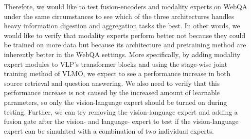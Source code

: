 \documentclass[nohyperref]{article}
\theoremstyle{plain}
\theoremstyle{definition}
\theoremstyle{remark}
\begin{document}
    Therefore, we would like to test fusion-encoders and modality experts on WebQA under the same
    circumstances to see which of the three architectures handles heavy information digestion and aggregation tasks the best.
    In other words, we would like to verify that modality experts perform better not because they could be trained on
    more data but because its architecture and pretraining method are inherently better in the WebQA settings.
    More specifically, by adding modality expert modules to VLP's transformer blocks and using the stage-wise joint
    training method of VLMO, we expect to see a performance increase in both source retrieval and question answering.
    We also need to verify that this performance increase is not caused by the increased amount of learnable parameters,
    so only the vision-language expert should be turned on during testing.
    Further, we can try removing the vision-language expert and adding a fusion gate after the vision- and
    language- expert to test if the vision-language expert can be simulated with a combination of two individual experts.


    
    
\end{document}
